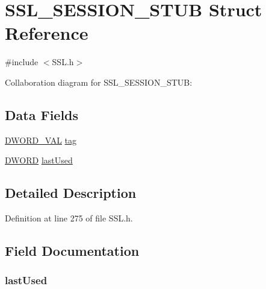 \hypertarget{struct_s_s_l___s_e_s_s_i_o_n___s_t_u_b}{}\section{S\+S\+L\+\_\+\+S\+E\+S\+S\+I\+O\+N\+\_\+\+S\+T\+U\+B Struct Reference}
\label{struct_s_s_l___s_e_s_s_i_o_n___s_t_u_b}


{\ttfamily \#include $<$S\+S\+L.\+h$>$}



Collaboration diagram for S\+S\+L\+\_\+\+S\+E\+S\+S\+I\+O\+N\+\_\+\+S\+T\+U\+B\+:
\subsection*{Data Fields}
\begin{DoxyCompactItemize}
\item 
\hyperlink{union_d_w_o_r_d___v_a_l}{D\+W\+O\+R\+D\+\_\+\+V\+A\+L} \hyperlink{struct_s_s_l___s_e_s_s_i_o_n___s_t_u_b_ab0e262b86259275e6c2dc760e6c5b41c}{tag}
\item 
\hyperlink{_generic_type_defs_8h_ad342ac907eb044443153a22f964bf0af}{D\+W\+O\+R\+D} \hyperlink{struct_s_s_l___s_e_s_s_i_o_n___s_t_u_b_ad74c283b80d3905808e550186f123179}{last\+Used}
\end{DoxyCompactItemize}


\subsection{Detailed Description}


Definition at line 275 of file S\+S\+L.\+h.



\subsection{Field Documentation}
\hypertarget{struct_s_s_l___s_e_s_s_i_o_n___s_t_u_b_ad74c283b80d3905808e550186f123179}{}
\subsubsection[{last\+Used}]{ last\+Used}\label{struct_s_s_l___s_e_s_s_i_o_n___s_t_u_b_ad74c283b80d3905808e550186f123179}


